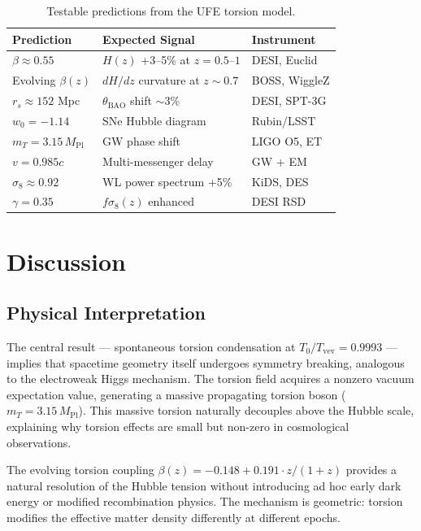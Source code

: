 \documentclass[twocolumn,prd,superscriptaddress,nofootinbib]{revtex4-2}
\begin{document}
\begin{table}[h]
\caption{Testable predictions from the UFE torsion model.}
\label{tab:predictions}
\begin{ruledtabular}
\begin{tabular}{lll}
Prediction & Expected Signal & Instrument \\
\hline
$\beta \approx 0.55$ & $H(z)$ +3--5\% at $z = 0.5$--$1$ & DESI, Euclid \\
Evolving $\beta(z)$ & $dH/dz$ curvature at $z \sim 0.7$ & BOSS, WiggleZ \\
$r_s \approx 152$ Mpc & $\theta_\text{BAO}$ shift $\sim$3\% & DESI, SPT-3G \\
$w_0 = -1.14$ & SNe Hubble diagram & Rubin/LSST \\
$m_T = 3.15\,M_\text{Pl}$ & GW phase shift & LIGO O5, ET \\
$v = 0.985c$ & Multi-messenger delay & GW + EM \\
$\sigma_8 \approx 0.92$ & WL power spectrum +5\% & KiDS, DES \\
$\gamma = 0.35$ & $f\sigma_8(z)$ enhanced & DESI RSD \\
\end{tabular}
\end{ruledtabular}
\end{table}

\section{Discussion}
\label{sec:discussion}

\subsection{Physical Interpretation}

The central result --- spontaneous torsion condensation at $T_0/T_\text{vev} = 0.9993$ --- implies that spacetime geometry itself undergoes symmetry breaking, analogous to the electroweak Higgs mechanism. The torsion field acquires a nonzero vacuum expectation value, generating a massive propagating torsion boson ($m_T = 3.15\,M_\text{Pl}$). This massive torsion naturally decouples above the Hubble scale, explaining why torsion effects are small but non-zero in cosmological observations.

The evolving torsion coupling $\beta(z) = -0.148 + 0.191 \cdot z/(1+z)$ provides a natural resolution of the Hubble tension without introducing ad hoc early dark energy or modified recombination physics. The mechanism is geometric: torsion modifies the effective matter density differently at different epochs.
\end{document}
